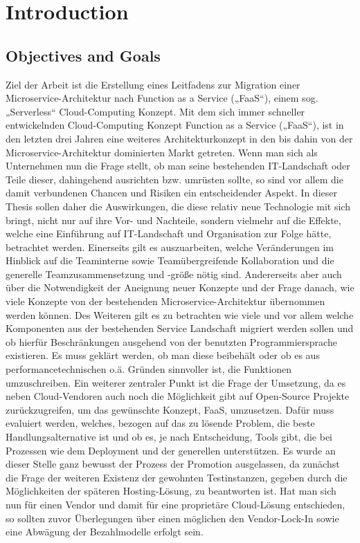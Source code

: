 \documentclass[a4paper,twoside,11pt, pagesize]{scrartcl}
\begin{document}
\section{Introduction}

\subsection{Objectives and Goals}
Ziel der Arbeit ist die Erstellung eines Leitfadens zur Migration einer Microservice-Architektur nach Function as a Service („FaaS“), einem sog. „Serverless“ Cloud-Computing Konzept.
Mit dem sich immer schneller entwickelnden Cloud-Computing Konzept Function as a Service („FaaS“), ist in den letzten drei Jahren eine weiteres Architekturkonzept in den bis dahin von der Microservice-Architektur dominierten Markt getreten. Wenn man sich als Unternehmen nun die Frage stellt, ob man seine bestehenden IT-Landschaft oder Teile dieser, dahingehend ausrichten bzw. umrüsten sollte, so sind vor allem die damit verbundenen Chancen und Risiken ein entscheidender Aspekt. 
In dieser Thesis sollen daher die Auswirkungen, die diese relativ neue Technologie mit sich bringt, nicht nur auf ihre Vor- und Nachteile, sondern vielmehr auf die Effekte, welche eine Einführung auf IT-Landschaft und Organisation zur Folge hätte, betrachtet werden. Einerseits gilt es auszuarbeiten, welche Veränderungen im Hinblick auf die Teaminterne sowie Teamübergreifende Kollaboration und die generelle Teamzusammensetzung und -größe nötig sind. Andererseits aber auch über die Notwendigkeit der Aneignung neuer Konzepte und der Frage danach, wie viele Konzepte von der bestehenden Microservice-Architektur übernommen werden können. Des Weiteren gilt es zu betrachten wie viele und vor allem welche Komponenten aus der bestehenden Service Landschaft migriert werden sollen und ob hierfür Beschränkungen ausgehend von der benutzten Programmiersprache existieren. Es muss geklärt werden, ob man diese beibehält oder ob es aus performancetechnischen o.ä. Gründen sinnvoller ist, die Funktionen umzuschreiben. Ein weiterer zentraler Punkt ist die Frage der Umsetzung, da es neben Cloud-Vendoren auch noch die Möglichkeit gibt auf Open-Source Projekte zurückzugreifen, um das gewünschte Konzept, FaaS, umzusetzen. Dafür muss evaluiert werden, welches, bezogen auf das zu lösende Problem, die beste Handlungsalternative ist und ob es, je nach Entscheidung, Tools gibt, die bei Prozessen wie dem Deployment und der generellen unterstützen. Es wurde an dieser Stelle ganz bewusst der Prozess der Promotion ausgelassen, da zunächst die Frage der weiteren Existenz der gewohnten Testinstanzen, gegeben durch die Möglichkeiten der späteren Hosting-Lösung, zu beantworten ist. Hat man sich nun für einen Vendor und damit für eine proprietäre Cloud-Lösung entschieden, so sollten zuvor Überlegungen über einen möglichen den Vendor-Lock-In sowie eine Abwägung der Bezahlmodelle erfolgt sein. 
\end{document}
